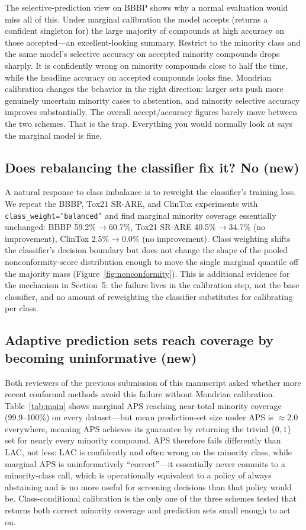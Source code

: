 \documentclass[11pt]{article}
\begin{document}
The selective-prediction view on BBBP shows why a normal evaluation would miss all of this. Under
marginal calibration the model accepts (returns a confident singleton for) the large majority of
compounds at high accuracy on those accepted---an excellent-looking summary. Restrict to the
minority class and the same model's selective accuracy on accepted minority compounds drops
sharply. It is confidently wrong on minority compounds close to half the time, while the headline
accuracy on accepted compounds looks fine. Mondrian calibration changes the behavior in the right
direction: larger sets push more genuinely uncertain minority cases to abstention, and minority
selective accuracy improves substantially. The overall accept/accuracy figures barely move between
the two schemes. That is the trap. Everything you would normally look at says the marginal model is
fine.

\subsection{Does rebalancing the classifier fix it? No (new)}

A natural response to class imbalance is to reweight the classifier's training loss. We repeat the
BBBP, Tox21 SR-ARE, and ClinTox experiments with \texttt{class\_weight=`balanced'} and find marginal
minority coverage essentially unchanged: BBBP 59.2\%$\to$60.7\%, Tox21 SR-ARE 40.5\%$\to$34.7\% (no
improvement), ClinTox 2.5\%$\to$0.0\% (no improvement). Class weighting shifts the classifier's
decision boundary but does not change the shape of the pooled nonconformity-score distribution
enough to move the single marginal quantile off the majority mass (Figure~\ref{fig:nonconformity}).
This is additional evidence for the mechanism in Section~5: the failure lives in the calibration
step, not the base classifier, and no amount of reweighting the classifier substitutes for
calibrating per class.

\subsection{Adaptive prediction sets reach coverage by becoming uninformative (new)}

Both reviewers of the previous submission of this manuscript asked whether more recent conformal
methods avoid this failure without Mondrian calibration. Table~\ref{tab:main} shows marginal APS
reaching near-total minority coverage (99.9--100\%) on every dataset---but mean prediction-set size
under APS is $\approx 2.0$ everywhere, meaning APS achieves its guarantee by returning the trivial
$\{0,1\}$ set for nearly every minority compound. APS therefore fails differently than LAC, not
less: LAC is confidently and often wrong on the minority class, while marginal APS is uninformatively
``correct''---it essentially never commits to a minority-class call, which is operationally
equivalent to a policy of always abstaining and is no more useful for screening decisions than that
policy would be. Class-conditional calibration is the only one of the three schemes tested that
returns both correct minority coverage and prediction sets small enough to act on.
\end{document}
